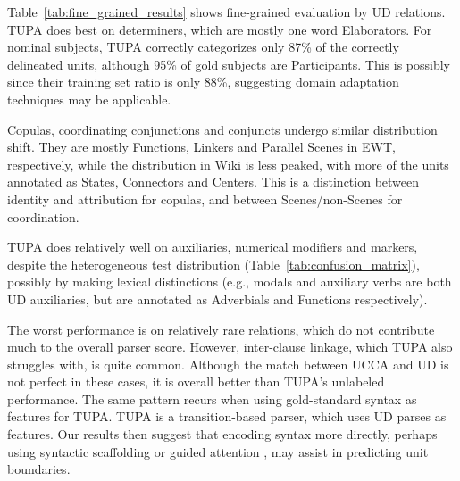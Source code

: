 \documentclass[11pt,a4paper]{article}
\begin{document}
Table~\ref{tab:fine_grained_results} shows
fine-grained evaluation by UD relations.
TUPA does best on determiners, which are mostly one word Elaborators.
For nominal subjects,
TUPA correctly categorizes only 87\% of the correctly delineated units,
although 95\% of gold subjects are Participants.
This is possibly since their training set ratio is only 88\%,
suggesting domain adaptation techniques may be applicable.

Copulas, coordinating conjunctions and conjuncts
undergo similar distribution shift.
They are mostly Functions, Linkers and Parallel Scenes in EWT, respectively,
while the distribution in Wiki is less peaked, with more of the units annotated as
States, Connectors and Centers.
This is a distinction between identity and attribution for copulas,
and between Scenes/non-Scenes for coordination.

TUPA does relatively well on auxiliaries, numerical modifiers and markers,
despite the heterogeneous test distribution (Table~\ref{tab:confusion_matrix}),
possibly by making lexical distinctions
(e.g., modals and auxiliary verbs are both UD auxiliaries,
but are annotated as Adverbials and Functions respectively).

The worst performance is on relatively rare relations,
which do not contribute much to the overall parser score.
However, inter-clause linkage, which TUPA also struggles with, is quite common.
Although the match between UCCA and UD is not perfect in these cases,
it is overall better than TUPA's unlabeled performance.
The same pattern recurs when using gold-standard syntax as features for TUPA.
TUPA is a transition-based parser, which uses UD parses as features. Our
results then suggest that encoding syntax more directly, perhaps using syntactic
scaffolding \citep{swayamdipta2018syntactic}
or guided attention \citep{strubell2018linguistically},
may assist in predicting unit boundaries.
\end{document}
